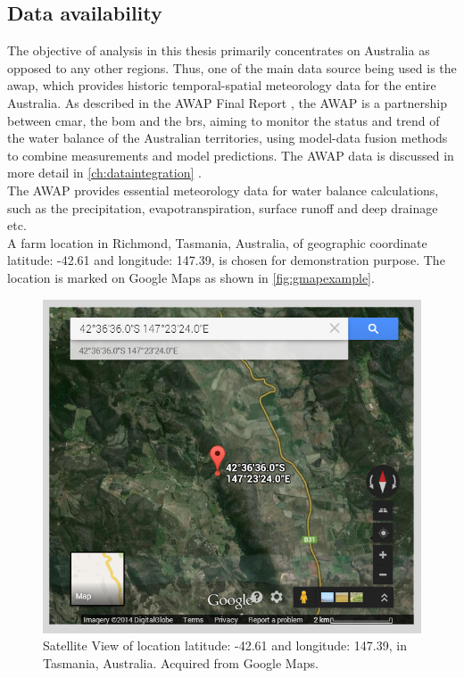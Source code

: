 \subsection{Data availability}\label{subsection:dataavailability}
The objective of analysis in this thesis primarily concentrates on Australia as opposed to any other regions. Thus, one of the main data source being used is the \ac{awap}, which provides historic temporal-spatial meteorology data for the entire Australia. As described in the AWAP Final Report \citep{Raupach2009}, the AWAP is a partnership between \ac{cmar}, the \ac{bom} and the \ac{brs}, aiming to monitor the status and trend of the water balance of the Australian territories, using model-data fusion methods to combine measurements and model predictions. The AWAP data is discussed in more detail in \autoref{ch:dataintegration} .\\
\newline
The AWAP provides essential meteorology data for water balance calculations, such as the precipitation, evapotranspiration, surface runoff and deep drainage etc.\\
\newline
A farm location in Richmond, Tasmania, Australia, of geographic coordinate latitude: -42.61 and longitude: 147.39, is chosen for demonstration purpose. The location is marked on Google Maps\citep{Google2014} as shown in \autoref{fig:gmapexample}.\\
\begin{figure}[hbt]
\begin{center}
\includegraphics[width=0.75\linewidth]{gfx/gmapexample}
\end{center}
\caption{Satellite View of location latitude: -42.61 and longitude: 147.39, in Tasmania, Australia. Acquired from Google Maps.}
\label{fig:gmapexample}
\end{figure}
